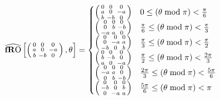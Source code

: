 \begin{equation}
\fROm \left[  \left(
\begin{smallmatrix}
 0   & 0   & 0  \\
 a   & 0   & -a \\
 b & - b & 0    \\
 \end{smallmatrix} 
\right)  ,\theta \right] =
\begin{cases}
 \left(
\begin{smallmatrix}
 0 & 0 & 0 \\
 a & 0 & -a \\
 b & -b & 0 \\
\end{smallmatrix} 
\right) & 0\leq (\theta  \bmod \pi )<\frac{\pi }{6} \\
 \left(
\begin{smallmatrix}
 0 & 0 & 0 \\
 0 & b & -b \\
 -a & a & 0 \\
\end{smallmatrix} 
\right) & \frac{\pi }{6}\leq (\theta  \bmod \pi )<\frac{\pi }{3} \\
 \left(
\begin{smallmatrix}
 0 & 0 & 0 \\
 0 & -a & a \\
 -b & 0 & b \\
\end{smallmatrix} 
\right) & \frac{\pi }{3}\leq (\theta  \bmod \pi )<\frac{\pi }{2} \\
 \left(
\begin{smallmatrix}
 0 & 0 & 0 \\
 b & -b & 0 \\
 a & 0 & -a \\
\end{smallmatrix} 
\right) & \frac{\pi }{2}\leq (\theta  \bmod \pi )<\frac{2 \pi }{3} \\
 \left(
\begin{smallmatrix}
 0 & 0 & 0 \\
 -a & a & 0 \\
 0 & b & -b \\
\end{smallmatrix} 
\right) & \frac{2 \pi }{3}\leq (\theta  \bmod \pi )<\frac{5 \pi }{6} \\
 \left(
\begin{smallmatrix}
 0 & 0 & 0 \\
 -b & 0 & b \\
 0 & -a & a \\
\end{smallmatrix} 
\right) & \frac{5 \pi }{6}\leq (\theta  \bmod \pi )<\pi 
\end{cases}
\end{equation}

